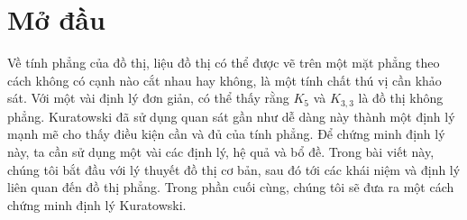 \section{Mở đầu}

Về tính phẳng của đồ thị, liệu đồ thị có thể được vẽ trên một mặt phẳng theo cách không có cạnh nào cắt nhau hay không,
là một tính chất thú vị cần khảo sát. Với một vài định lý đơn giản, có thể thấy rằng $K_5$ và $K_{3,3}$ là đồ thị không phẳng.
Kuratowski đã sử dụng quan sát gần như dễ dàng này thành một định lý mạnh mẽ cho thấy điều kiện cần và đủ của tính phẳng.
Để chứng minh định lý này, ta cần sử dụng một vài các định lý, hệ quả và bổ đề.
Trong bài viết này, chúng tôi bắt đầu với lý thuyết đồ thị cơ bản, sau đó tới các khái niệm và định lý liên quan đến đồ thị phẳng.
Trong phần cuối cùng, chúng tôi sẽ đưa ra một cách chứng minh định lý Kuratowski.